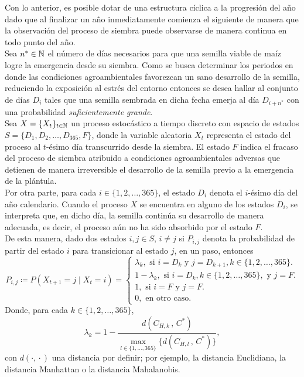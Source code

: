 Con lo anterior, es posible dotar de una estructura cíclica a la progresión del año dado que al finalizar un año inmediatamente comienza el siguiente de manera que la observación del proceso de siembra puede observarse de manera continua en todo punto del año.\\

Sea $n^*\in \mathbb{N}$ el número de días necesarios para que una semilla viable de maíz logre la emergencia desde su siembra. Como se busca determinar los periodos en donde las condiciones agroambientales favorezcan un sano desarrollo de la semilla, reduciendo la exposición al estrés del entorno entonces se desea hallar al conjunto de días $D_i$ tales que una semilla sembrada en dicha fecha emerja al día $D_{i+n^*}$ con una probabilidad \textit{suficientemente grande}.\\

Sea $X=\{X_t\}_{t\in \mathbb{N}}$ un proceso estocástico a tiempo discreto con espacio de estados $S=\{D_1, D_2,\ldots, D_{365}, F\}$, donde la variable aleatoria $X_t$ representa el estado del proceso al $t$-ésimo día transcurrido desde la siembra. El estado $F$ indica el fracaso del proceso de siembra atribuido a condiciones agroambientales adversas que detienen de manera irreversible el desarrollo de la semilla previo a la emergencia de la plántula.\\


Por otra parte, para cada $i\in\{1,2,\ldots,365\}$, el estado $D_i$ denota el $i$-ésimo día del año calendario. Cuando el proceso $X$ se encuentra en alguno de los estados $D_i$, se interpreta que, en dicho día, la semilla continúa su desarrollo de manera adecuada, es decir, el proceso aún no ha sido absorbido por el estado $F$.\\

De esta manera, dado dos estados $i,j\in S$, $i\neq j$ si $P_{i,j}$ denota la probabilidad de partir del estado $i$ para transicionar al estado $j$, en un paso, entonces \begin{equation}
	P_{i, j} \coloneqq P(X_{t+1}= j\mid X_{t}= i ) = 
	\begin{cases}
		\lambda_k, \text{ si } i=D_k \text{ y } j= D_{k+1}, k\in \{1,2,\ldots,365\}.\\
		1-\lambda_k, \text{ si } i=D_k, k\in \{1,2,\ldots,365\}, \text{ y } j= F.\\
		1, \text{ si } i=F \text{ y } j= F.\\
		0, \text{ en otro caso.}
	\end{cases}
	\label{TransitionProbs}
\end{equation}
Donde, para cada $k\in \{1,2,\ldots, 365\}$, \begin{equation}
	\lambda_k= 1- \frac{d(C_{H,k} \,\mathbf{,}\, C^*)}{\displaystyle \max_{l\in \{1,\ldots, 365\}} \{d(C_{H,l}\, \mathbf{,} \,C^*)\}},
	\label{lambdas}
\end{equation}con $d(\cdot\mathbf{,} \cdot)$ una distancia por definir; por ejemplo, la distancia Euclidiana, la distancia Manhattan o la distancia Mahalanobis.\\

